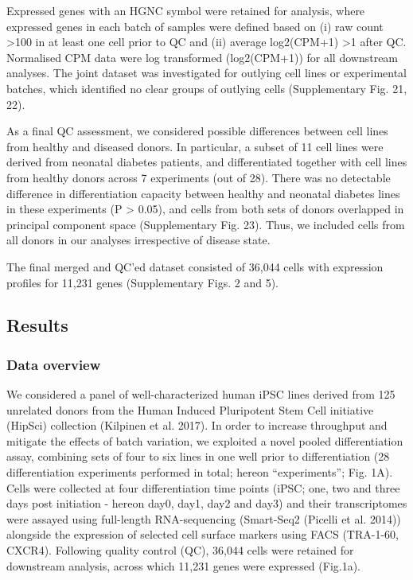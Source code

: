 Expressed genes with an HGNC symbol were retained for analysis, where expressed genes in each batch of samples were defined based on (i) raw count >100 in at least one cell prior to QC and (ii) average log2(CPM+1) >1 after QC. 
Normalised CPM data were log transformed (log2(CPM+1)) for all downstream analyses. 
The joint dataset was investigated for outlying cell lines or experimental batches, which identified no clear groups of outlying cells (Supplementary Fig. 21, 22). 

As a final QC assessment, we considered possible differences between cell lines from healthy and diseased donors. 
In particular, a subset of 11 cell lines were derived from neonatal diabetes patients, and differentiated together with cell lines from healthy donors across 7 experiments (out of 28). There was no detectable difference in differentiation capacity between healthy and neonatal diabetes lines in these experiments (P > 0.05), and cells from both sets of donors overlapped in principal component space (Supplementary Fig. 23). 
Thus, we included cells from all donors in our analyses irrespective of disease state.

The final merged and QC’ed dataset consisted of 36,044 cells with expression profiles for 11,231 genes (Supplementary Figs. 2 and 5).


\subsection{Results}

\subsubsection{Data overview}

 We considered a panel of well-characterized human iPSC lines derived from 125 unrelated donors from the Human Induced Pluripotent Stem Cell initiative (HipSci) collection (Kilpinen et al. 2017). 
 In order to increase throughput and mitigate the effects of batch variation, we exploited a novel pooled differentiation assay, combining sets of four to six lines in one well prior to differentiation (28 differentiation experiments performed in total; hereon “experiments”; Fig. 1A). 
 Cells were collected at four differentiation time points (iPSC; one, two and three days post initiation - hereon day0, day1, day2 and day3) and their transcriptomes were assayed using full-length RNA-sequencing (Smart-Seq2 (Picelli et al. 2014)) alongside the expression of selected cell surface markers using FACS (TRA-1-60, CXCR4). 
 Following quality control (QC), 36,044 cells were retained for downstream analysis, across which 11,231 genes were expressed (Fig.1a).
 
